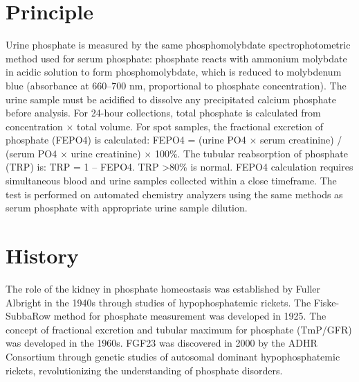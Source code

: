 \section*{Principle}
Urine phosphate is measured by the same phosphomolybdate spectrophotometric method used for serum phosphate: phosphate reacts with ammonium molybdate in acidic solution to form phosphomolybdate, which is reduced to molybdenum blue (absorbance at 660--700 nm, proportional to phosphate concentration). The urine sample must be acidified to dissolve any precipitated calcium phosphate before analysis. For 24-hour collections, total phosphate is calculated from concentration $\times$ total volume. For spot samples, the fractional excretion of phosphate (FEPO4) is calculated: FEPO4 = (urine PO4 $\times$ serum creatinine) / (serum PO4 $\times$ urine creatinine) $\times$ 100\%. The tubular reabsorption of phosphate (TRP) is: TRP = 1 -- FEPO4. TRP >80\% is normal. FEPO4 calculation requires simultaneous blood and urine samples collected within a close timeframe. The test is performed on automated chemistry analyzers using the same methods as serum phosphate with appropriate urine sample dilution.

\section*{History}
The role of the kidney in phosphate homeostasis was established by Fuller Albright in the 1940s through studies of hypophosphatemic rickets. The Fiske-SubbaRow method for phosphate measurement was developed in 1925. The concept of fractional excretion and tubular maximum for phosphate (TmP/GFR) was developed in the 1960s. FGF23 was discovered in 2000 by the ADHR Consortium through genetic studies of autosomal dominant hypophosphatemic rickets, revolutionizing the understanding of phosphate disorders.

